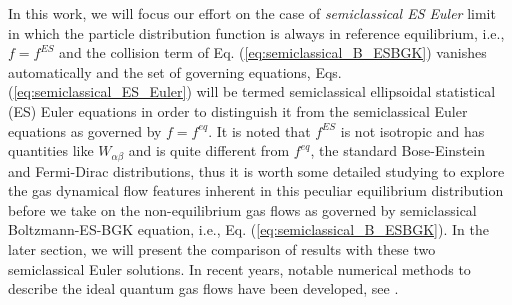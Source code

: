 \documentclass{rsproca}%
\begin{document}
In this work, we will focus our effort on the case of {\em semiclassical ES Euler} limit in which the particle distribution function is always in reference equilibrium, i.e., $f=f^{ES}$ and the collision term of Eq. (\ref{eq:semiclassical_B_ESBGK}) vanishes automatically and the set of governing equations, Eqs. (\ref{eq:semiclassical_ES_Euler}) will be termed semiclassical ellipsoidal statistical (ES) Euler equations in order to distinguish it from the semiclassical Euler equations as governed by $f=f^{eq}$.  It is noted that $f^{ES}$ is not isotropic and has quantities like $W_{\alpha \beta}$ and is quite different from $f^{eq}$, the standard Bose-Einstein and Fermi-Dirac distributions, thus it is worth some detailed studying to explore the gas dynamical flow features inherent in this peculiar equilibrium distribution before we take on the non-equilibrium gas flows as governed by semiclassical Boltzmann-ES-BGK equation, i.e., Eq. (\ref{eq:semiclassical_B_ESBGK}). In the later section, we will present the comparison of results with these two semiclassical Euler solutions.  In recent years, notable numerical methods to describe the ideal quantum gas flows have been developed, see \cite{1272832,Shi20089389,Jaw-YenYang05082006}.
\end{document}
